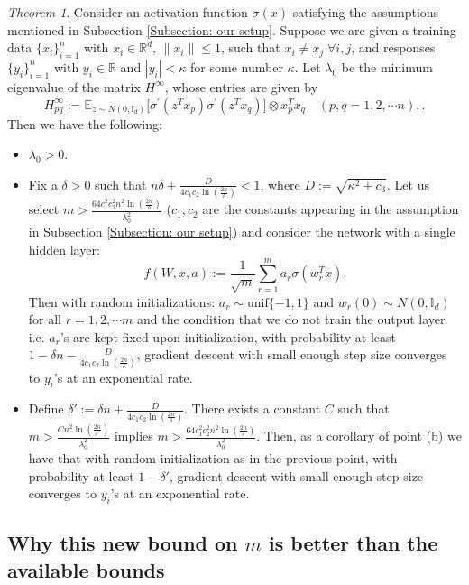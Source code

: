 \documentclass[a4paper,11pt]{amsart}
\newcommand{\IE}{\mathbb{E}}
\theoremstyle{definition}
\theoremstyle{plain}
\theoremstyle{remark}
\newcommand{\IR}{\mathbb{R}}
\newcommand{\ot}{\otimes}
\newtheorem{theoremA}{Theorem}
\begin{document}
\renewcommand{\thetheoremA}{\ref{Theorem: main result}}
\begin{theoremA}
Consider an activation function $\sigma(x)$ satisfying the assumptions mentioned in Subsection \ref{Subsection: our setup}. 
Suppose we are given a training data $\{x_i\}_{i=1}^n$ with $x_i\in\IR^d$, $\|x_i\|\leq1$, such that $x_i \neq x_j \; \forall i,j$, and responses $\{y_i\}_{i=1}^n$ with $y_i\in\IR$ and $|y_i|<\kappa$ for some number $\kappa$. Let $\lambda_0$ be the minimum eigenvalue of the matrix $H^\infty$, whose entries are given by 
\[
H^\infty_{pq}:=\IE_{z\sim N(0,\mathbb{I}_d)}\Big[\sigma^\prime(z^Tx_p)\sigma^\prime(z^Tx_q)\Big]\ot x_p^Tx_q\quad(p,q=1,2,\cdots n),.
\]
Then we have the following:

\begin{itemize}

\item[(a)]
$\lambda_0>0$.

\item[(b)]
Fix a $\delta>0$ such that $n\delta+\frac{D}{4c_1c_2\ln(\frac{2n}{\delta})}<1$, where $D:=\sqrt{\kappa^2+c_3}$. 
Let us select $m>\frac{64c_1^2c_2^2n^2\ln(\frac{2n}{\delta})}{\lambda_0^2}$ ($c_1,c_2$ are the constants appearing in the assumption in Subsection \ref{Subsection: our setup}) and consider the network with a single hidden layer:\[f(W,x,a):=\frac{1}{\sqrt{m}}\sum_{r=1}^m a_r\sigma(w_r^Tx).\]
Then with random initializations: $a_r\sim\text{unif}\{-1,1\}$ and $w_r(0)\sim N(0,\mathbb{I}_d)$ for all $r=1,2,\cdots m$ and the condition that we do not train the output layer i.e. $a_r$'s are kept fixed upon initialization, with probability at least $1-\delta n-\frac{D}{4c_1c_2\ln(\frac{2n}{\delta})}$, gradient descent with small enough step size converges to $y_i$'s at an exponential rate.

\item[(c)]
Define $\delta' := \delta n+\frac{D}{4c_1c_2\ln(\frac{2n}{\delta})}$.
There exists a constant $C$ such that $m > \frac{C n^2\ln(\frac{2n}{\delta'})}{\lambda_0^2}$ implies $m>\frac{64c_1^2c_2^2n^2\ln(\frac{2n}{\delta})}{\lambda_0^2}$.
Then, as a corollary of point (b) we have that with random initialization as in the previous point, with probability at least $1-\delta'$, gradient descent with small enough step size converges to $y_i$'s at an exponential rate.

\end{itemize}
\end{theoremA}

\subsection{Why this new bound on $m$ is better than the available bounds}
\end{document}
